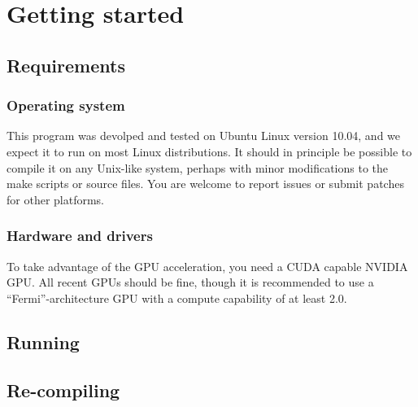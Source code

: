 \section{Getting started}

\subsection{Requirements}

\subsubsection{Operating system}

This program was devolped and tested on Ubuntu Linux version 10.04, and we expect it to run on most Linux distributions. It should in principle be possible to compile it on any Unix-like system, perhaps with minor modifications to the make scripts or source files. You are welcome to report issues or submit patches for other platforms.

\subsubsection{Hardware and drivers}


To take advantage of the GPU acceleration, you need a CUDA capable \textsc{NVIDIA} GPU. All recent GPUs should be fine, though it is recommended to use a ``Fermi''-architecture GPU with a compute capability of at least 2.0.


\subsection{Running}



\subsection{Re-compiling}




